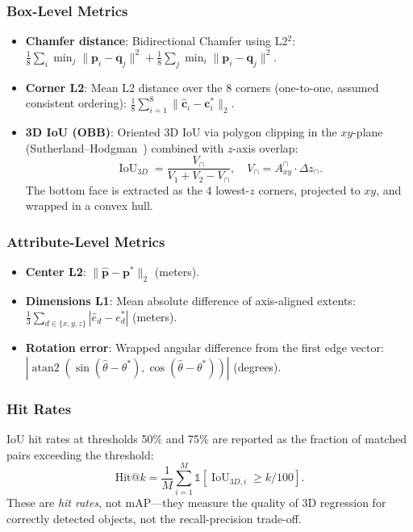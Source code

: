 \documentclass[runningheads]{llncs}
\newcommand{\op}[1]{\operatorname{#1}}
\newcommand{\mat}[1]{\bm{#1}}
\begin{document}
\subsubsection{Box-Level Metrics}

\begin{itemize}
    \item \textbf{Chamfer distance}: Bidirectional Chamfer using L2$^2$: $\frac{1}{8}\sum_i \min_j \|\mat{p}_i - \mat{q}_j\|^2 + \frac{1}{8}\sum_j \min_i \|\mat{p}_i - \mat{q}_j\|^2$.
    \item \textbf{Corner L2}: Mean L2 distance over the 8 corners (one-to-one, assumed consistent ordering): $\frac{1}{8}\sum_{i=1}^{8}\|\hat{\mat{c}}_i - \mat{c}_i^*\|_2$.
    \item \textbf{3D IoU (OBB)}: Oriented 3D IoU via polygon clipping in the $xy$-plane (Sutherland--Hodgman~\cite{sutherland1974reentrant}) combined with $z$-axis overlap:
    \begin{equation}
        \op{IoU}_{3D} = \frac{V_{\cap}}{V_1 + V_2 - V_{\cap}}, \quad V_{\cap} = A_{xy}^{\cap} \cdot \Delta z_{\cap}.
        \label{eq:iou3d}
    \end{equation}
    The bottom face is extracted as the 4 lowest-$z$ corners, projected to $xy$, and wrapped in a convex hull.
\end{itemize}

\subsubsection{Attribute-Level Metrics}

\begin{itemize}
    \item \textbf{Center L2}: $\|\hat{\mat{p}} - \mat{p}^*\|_2$ (meters).
    \item \textbf{Dimensions L1}: Mean absolute difference of axis-aligned extents: $\frac{1}{3}\sum_{d \in \{x,y,z\}} |\hat{e}_d - e_d^*|$ (meters).
    \item \textbf{Rotation error}: Wrapped angular difference from the first edge vector: $|\op{atan2}(\sin(\hat{\theta} - \theta^*), \cos(\hat{\theta} - \theta^*))|$ (degrees).
\end{itemize}

\subsubsection{Hit Rates}

IoU hit rates at thresholds 50\% and 75\% are reported as the fraction of matched pairs exceeding the threshold:
\begin{equation}
    \text{Hit@}k = \frac{1}{M}\sum_{i=1}^{M}\mathbb{1}[\op{IoU}_{3D,i} \geq k/100].
    \label{eq:hit_rate}
\end{equation}
These are \emph{hit rates}, not mAP---they measure the quality of 3D regression for correctly detected objects, not the recall-precision trade-off.
\end{document}
